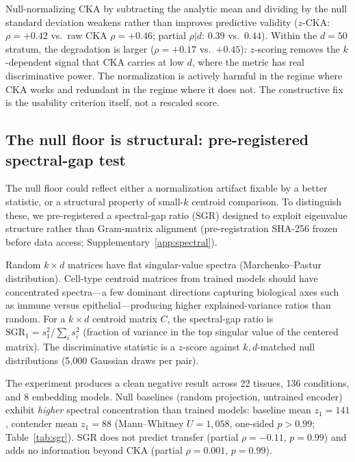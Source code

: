 \documentclass[11pt]{article}
\begin{document}
Null-normalizing CKA by subtracting the analytic mean and dividing by
the null standard deviation weakens rather than improves predictive
validity ($z$-CKA: $\rho = +0.42$ vs.\ raw CKA $\rho = +0.46$;
partial $\rho|d$: $0.39$ vs.\ $0.44$). Within the $d = 50$ stratum,
the degradation is larger ($\rho = +0.17$ vs.\ $+0.45$): $z$-scoring
removes the $k$-dependent signal that CKA carries at low $d$, where the
metric has real discriminative power. The normalization is actively
harmful in the regime where CKA works and redundant in the regime where
it does not. The constructive fix is the usability criterion itself,
not a rescaled score.


\subsection{The null floor is structural: pre-registered spectral-gap test}
\label{sec:spectral}

The null floor could reflect either a normalization artifact fixable by
a better statistic, or a structural property of small-$k$ centroid
comparison. To distinguish these, we pre-registered a spectral-gap
ratio (SGR) designed to exploit eigenvalue structure rather than
Gram-matrix alignment (pre-registration SHA-256 frozen before data
access; Supplementary~\ref{app:spectral}).

Random $k \times d$ matrices have flat singular-value spectra
(Marchenko--Pastur distribution). Cell-type centroid matrices from
trained models should have concentrated spectra---a few dominant
directions capturing biological axes such as immune versus
epithelial---producing higher explained-variance ratios than random.
For a $k \times d$ centroid matrix $C$, the spectral-gap ratio is
$\mathrm{SGR}_1 = s_1^2 / \sum_i s_i^2$ (fraction of variance in the
top singular value of the centered matrix). The discriminative
statistic is a $z$-score against $k,d$-matched null distributions
(5,000 Gaussian draws per pair).

The experiment produces a clean negative result across 22 tissues,
136 conditions, and 8 embedding models. Null baselines (random
projection, untrained encoder) exhibit \emph{higher} spectral
concentration than trained models: baseline mean $z_1 = 141$,
contender mean $z_1 = 88$ (Mann--Whitney $U = 1{,}058$, one-sided
$p > 0.99$; Table~\ref{tab:sgr}). SGR does not predict transfer
(partial $\rho = -0.11$, $p = 0.99$) and adds no information beyond
CKA (partial $\rho = 0.001$, $p = 0.99$).
\end{document}
